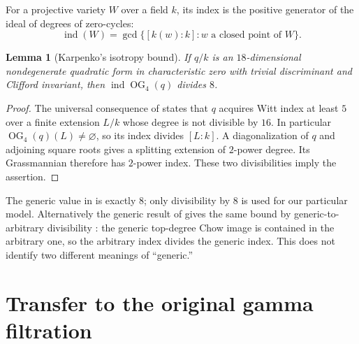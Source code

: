 \documentclass[11pt]{article}
\newtheorem{lemma}[theorem]{Lemma}
\newcommand{\OG}{\operatorname{OG}}
\newcommand{\ind}{\operatorname{ind}}
\begin{document}
For a projective variety $W$ over a field $k$, its index is the positive
generator of the ideal of degrees of zero-cycles:
\[
 \ind(W)=\gcd\{[k(w):k]:w\text{ a closed point of }W\}.
\]

\begin{lemma}[Karpenko's isotropy bound]\label{lem:index}
If $q/k$ is an $18$-dimensional nondegenerate quadratic form in
characteristic zero with trivial discriminant and Clifford invariant,
then $\ind\OG_4(q)$ divides $8$.
\end{lemma}
\begin{proof}
The universal consequence of \cite[Theorem 4.1 and Corollary 4.4]{isotropy}
states that $q$ acquires Witt index at least $5$ over a finite extension
$L/k$ whose degree is not divisible by $16$. In particular
$\OG_4(q)(L)\ne\varnothing$, so its index divides $[L:k]$.
A diagonalization of $q$ and adjoining square roots gives a splitting
extension of $2$-power degree. Its Grassmannian therefore has $2$-power
index. These two divisibilities imply the assertion.
\end{proof}

The generic value in \cite{isotropy} is exactly $8$; only divisibility
by $8$ is used for our particular model. Alternatively the generic result
of \cite{oddspin} gives the same bound by generic-to-arbitrary divisibility
\cite[Proposition 2.1]{dkm}: the generic top-degree Chow image is contained
in the arbitrary one, so the arbitrary index divides the generic index.
This does not identify two different meanings of ``generic.''

\section{Transfer to the original gamma filtration}
\end{document}
